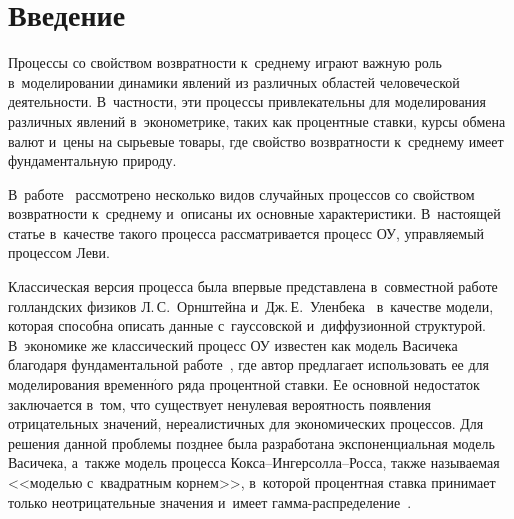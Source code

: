

\vspace*{-3pt} 



\thispagestyle{headings}

\begin{multicols}{2}

\label{st\stat}

\section{Введение}

Процессы со свойством возвратности к~среднему играют важную роль в~моделировании 
динамики явлений из различных областей человеческой деятельности.  В~частности, 
эти процессы привлекательны для моделирования различных явлений в~эконометрике, 
таких как процентные ставки, курсы обмена валют и~цены на сырьевые товары, где 
свойство возвратности к~среднему имеет фундаментальную природу. 

В~работе~\cite{brigo2007} рассмотрено несколько видов случайных процессов со свойством 
возвратности к~среднему и~описаны их основные характеристики.
В~настоящей статье в~качестве такого процесса рассматривается процесс 
ОУ, управляемый процессом Леви. 

Классическая версия 
процесса была 
впервые представлена в~совместной работе голландских физиков Л.\,С.~Орнштейна 
и~Дж.\,Е.~Уленбека~\cite{ou1930} в~качестве модели, которая способна описать данные 
с~гауссовской и~диффузионной структурой. В~экономике же классический процесс 
ОУ известен как модель Васичека благодаря фундаментальной 
работе~\cite{vasicek1977}, где автор предлагает использовать ее для 
моделирования временн$\acute{\mbox{о}}$го ряда процентной ставки. Ее основной недостаток 
заключается в~том, что существует ненулевая вероятность появления отрицательных 
значений, нереалистичных для экономических процессов. Для решения данной 
проблемы позднее была разработана экспоненциальная модель Васичека, а~также 
модель процесса Кок\-са--Ин\-гер\-сол\-ла--Рос\-са, также называемая <<мо\-делью 
с~квад\-рат\-ным корнем>>, в~которой процентная ставка принимает только 
неотрицательные значения и~имеет гам\-ма-рас\-пре\-де\-ле\-ние~\cite{cox1985}.


\end{multicols}
